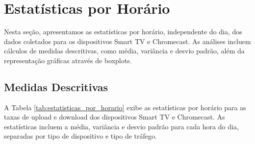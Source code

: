 \section{Estatísticas por Horário}

Nesta seção, apresentamos as estatísticas por horário, independente do dia, dos dados coletados para os dispositivos Smart TV e Chromecast. As análises incluem cálculos de medidas descritivas, como média, variância e desvio padrão, além da representação gráficas através de boxplots.

\subsection{Medidas Descritivas}

A Tabela \ref{tab:estatisticas_por_horario} exibe as estatísticas por horário para as taxas de upload e download dos dispositivos Smart TV e Chromecast. As estatísticas incluem a média, variância e desvio padrão para cada hora do dia, separadas por tipo de dispositivo e tipo de tráfego.


